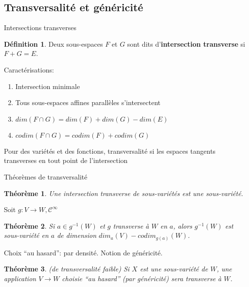 \documentclass[compress]{beamer}
\newcommand{\cinf}{\mathcal{C}^\infty}
\newtheorem{thm}{Théorème}
\theoremstyle{definition}
\newtheorem{defn}{Définition}
\begin{document}
\subsection{Transversalité et généricité}
\begin{frame}{Intersections transverses}
    \begin{defn}
        Deux sous-espaces $F$ et $G$ sont dits d'\textbf{intersection transverse} si $F+G=E$.
    \end{defn}

    \pause
    Caractérisations:
    \begin{enumerate}
        \item<2-> Intersection minimale
        \item<2-> Tous sous-espaces affines parallèles s'intersectent
        \item<3-> $dim(F\cap G)=dim(F)+dim(G)-dim(E)$
        \item<3-> $codim(F\cap G)=codim(F)+codim(G)$
    \end{enumerate}

    \pause[4]
    Pour des variétés et des fonctions, transversalité si les espaces tangents transverses en tout point de l'intersection
\end{frame}

\begin{frame}{Théorèmes de transversalité}
    \begin{thm}
        Une intersection transverse de sous-variétés est une sous-variété.
    \end{thm}
    \pause
    Soit $g:V\to W, \cinf$
    \begin{thm}
        Si $a\in g^{-1}(W)$ et $g$ transverse à $W$ en $a$, alors $g^{-1}(W)$ est sous-variété en $a$ de dimension $dim_a(V)-codim_{g(a)}(W)$.
    \end{thm}

    \pause
    Choix ``au hasard'': par densité.
    Notion de \alert{généricité}.

    \pause
    \begin{thm}{(de transversalité faible)}
        Si $X$ est une sous-variété de $W$, une application $V\to W$ choisie ``au hasard'' (par généricité) sera transverse à $W$.
    \end{thm}
\end{frame}
\end{document}
